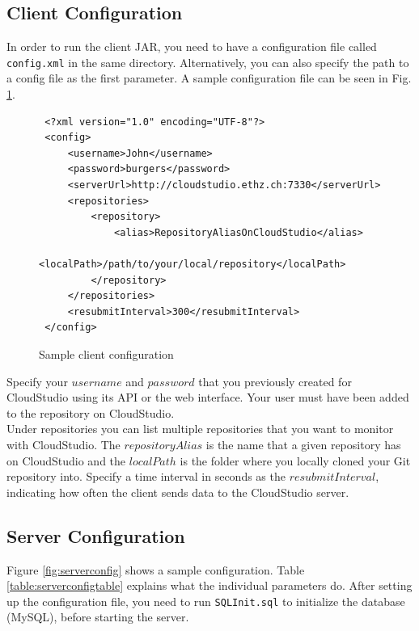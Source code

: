 \subsection{Client Configuration}

In order to run the client JAR, you need to have a configuration file called \texttt{config.xml} in the same directory. Alternatively, you can also specify the path to a config file as the first parameter. A sample configuration file can be seen in Fig. \ref{fig:clientconfig}. \\

\begin{figure}[h!]
\begin{lstlisting}
 <?xml version="1.0" encoding="UTF-8"?>
 <config>
     <username>John</username>
     <password>burgers</password>
     <serverUrl>http://cloudstudio.ethz.ch:7330</serverUrl>
     <repositories>
         <repository>
             <alias>RepositoryAliasOnCloudStudio</alias>
             <localPath>/path/to/your/local/repository</localPath>
         </repository>
     </repositories>
     <resubmitInterval>300</resubmitInterval>
 </config>
\end{lstlisting}
  \centering
  \caption{Sample client configuration}
  \label{fig:clientconfig}
\end{figure}


Specify your $username$ and $password$ that you previously created for CloudStudio using its API or the web interface. Your user must have been added to the repository on CloudStudio. \\

Under repositories you can list multiple repositories that you want to monitor with CloudStudio. The $repositoryAlias$ is the name that a given repository has on CloudStudio and the $localPath$ is the folder where you locally cloned your Git repository into. Specify a time interval in seconds as the $resubmitInterval$, indicating how often the client sends data to the CloudStudio server.


\subsection{Server Configuration}

Figure \ref{fig:serverconfig} shows a sample configuration. Table \ref{table:serverconfigtable} explains what the individual parameters do. After setting up the configuration file, you need to run \texttt{SQLInit.sql} to initialize the database (MySQL), before starting the server.

